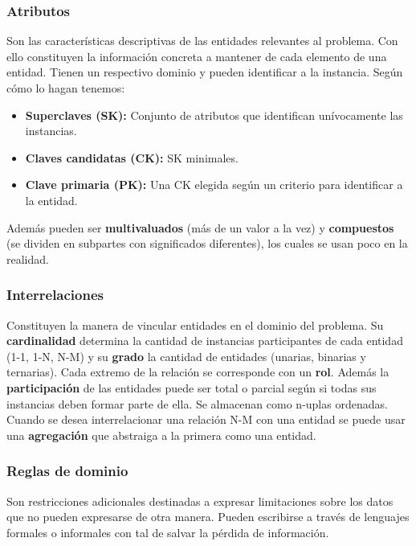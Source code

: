 \subsubsection*{Atributos}
Son las características descriptivas de las entidades relevantes al problema. Con ello constituyen la información concreta a mantener de cada elemento de una entidad. Tienen un respectivo dominio y pueden identificar a la instancia. Según cómo lo hagan tenemos:
\begin{itemize}
    \item \textbf{Superclaves (SK):} Conjunto de atributos que identifican unívocamente las instancias.
    \item \textbf{Claves candidatas (CK):} SK minimales.
    \item \textbf{Clave primaria (PK):} Una CK elegida según un criterio para identificar a la entidad.
\end{itemize}
Además pueden ser \textbf{multivaluados} (más de un valor a la vez) y \textbf{compuestos} (se dividen en subpartes con significados diferentes), los cuales se usan poco en la realidad.

\subsubsection*{Interrelaciones}
Constituyen la manera de vincular entidades en el dominio del problema. Su \textbf{cardinalidad} determina la cantidad de instancias participantes de cada entidad (1-1, 1-N, N-M) y su \textbf{grado} la cantidad de entidades (unarias, binarias y ternarias). Cada extremo de la relación se corresponde con un \textbf{rol}. Además la \textbf{participación} de las entidades puede ser total o parcial según si todas sus instancias deben formar parte de ella. Se almacenan como n-uplas ordenadas. \\
Cuando se desea interrelacionar una relación N-M con una entidad se puede usar una \textbf{agregación} que abstraiga a la primera como una entidad.

\subsubsection*{Reglas de dominio}
Son restricciones adicionales destinadas a expresar limitaciones sobre los datos que no pueden expresarse de otra manera. Pueden escribirse a través de lenguajes formales o informales con tal de salvar la pérdida de información.

